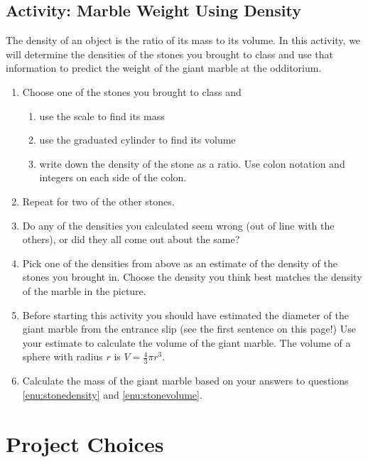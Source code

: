\subsection{Activity: Marble Weight Using Density}
The density of an object is the ratio of its mass to its volume. In this activity, we will determine the densities of the stones you brought to class and use that information to predict the weight of the giant marble at the odditorium.
\begin{enumerate}
    \item Choose one of the stones you brought to class and
    \begin{enumerate}
        \item use the scale to find its mass\wbvfill
        \item use the graduated cylinder to find its volume\wbvfill
        \item write down the density of the stone as a ratio. Use colon notation and integers on each side of the colon.\wbvfill
    \end{enumerate}
    \item Repeat for two of the other stones.
    \item Do any of the densities you calculated seem wrong (out of line with the others), or did they all come out about the same?\wbvfill
    \item \label{enu:stonedensity}Pick one of the densities from above as an estimate of the density of the stones you brought in. Choose the density you think best matches the density of the marble in the picture.\wbvfill
    \item \label{enu:stonevolume}Before starting this activity you should have estimated the diameter of the giant marble from the entrance slip (see the first sentence on this page!) Use your estimate to calculate the volume of the giant marble. The volume of a sphere with radius $r$ is $V=\frac43\pi r^3$.\wbvfill
    \item Calculate the mass of the giant marble based on your answers to questions \ref{enu:stonedensity} and \ref{enu:stonevolume}. \wbvfill
\end{enumerate}

\wbnewpage
\section{Project Choices}\label{sec:RatiosProjects}

